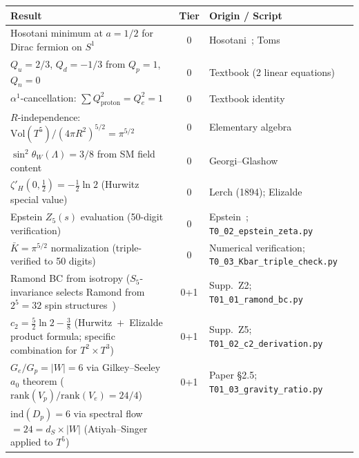 \documentclass[11pt,a4paper]{article}
\begin{document}
\begin{center}
\renewcommand{\arraystretch}{1.15}\small
\begin{tabular}{>{\raggedright}p{5.5cm}cp{5.5cm}}
\toprule
\textbf{Result} & \textbf{Tier} & \textbf{Origin / Script}\\
\midrule
\rowcolor{tier0}
Hosotani minimum at $a{=}1/2$ for Dirac fermion on $S^1$
  & 0 & Hosotani~\cite{Hosotani1983}; Toms~\cite{Toms1983}\\
\rowcolor{tier0}
$Q_u{=}2/3$, $Q_d{=}-1/3$ from $Q_p{=}1$, $Q_n{=}0$
  & 0 & Textbook (2 linear equations)\\
\rowcolor{tier0}
$\alpha^1$-cancellation: $\sum Q^2_{\mathrm{proton}}=Q^2_e=1$
  & 0 & Textbook identity\\
\rowcolor{tier0}
$R$-independence: $\mathrm{Vol}(T^5)/(4\pi R^2)^{5/2}=\pi^{5/2}$
  & 0 & Elementary algebra\\
\rowcolor{tier0}
$\sin^2\theta_W(\Lambda)=3/8$ from SM field content
  & 0 & Georgi--Glashow~\cite{GeorgiGlashow1974}\\
\rowcolor{tier0}
$\zeta'_H(0,\tfrac12)=-\tfrac12\ln 2$ (Hurwitz special value)
  & 0 & Lerch (1894); Elizalde~\cite{Elizalde1995}\\
\rowcolor{tier0}
Epstein $Z_5(s)$ evaluation (50-digit verification)
  & 0 & Epstein~\cite{Epstein1903}; \texttt{T0\_02\_epstein\_zeta.py}\\
\rowcolor{tier0}
$\bar K=\pi^{5/2}$ normalization (triple-verified to 50 digits)
  & 0 & Numerical verification; \texttt{T0\_03\_Kbar\_triple\_check.py}\\
\midrule
\rowcolor{tier01}
Ramond BC from isotropy ($S_5$-invariance selects Ramond
  from $2^5{=}32$ spin structures~\cite{LawsonMichelsohn1989})
  & 0{+}1 & Supp.\ Z2; \texttt{T01\_01\_ramond\_bc.py}\\
\rowcolor{tier01}
$c_2=\tfrac52\ln 2-\tfrac38$ (Hurwitz~$+$~Elizalde product formula;
  specific combination for $T^2{\times}T^3$)
  & 0{+}1 & Supp.\ Z5; \texttt{T01\_02\_c2\_derivation.py}\\
\rowcolor{tier01}
$G_e/G_p = |W|= 6$ via Gilkey--Seeley~\cite{Gilkey1984,Seeley1967}
  $a_0$ theorem ($\mathrm{rank}(V_p)/\mathrm{rank}(V_e)=24/4$)
  & 0{+}1 & Paper \S 2.5; \texttt{T01\_03\_gravity\_ratio.py}\\
\rowcolor{tier01}
$\mathrm{ind}(D_p)=6$ via spectral flow${=}24{=}d_S{\times}|W|$
  (Atiyah--Singer~\cite{AtiyahSinger1968} applied to $T^5$)

\end{tabular}
\end{center}
\end{document}
